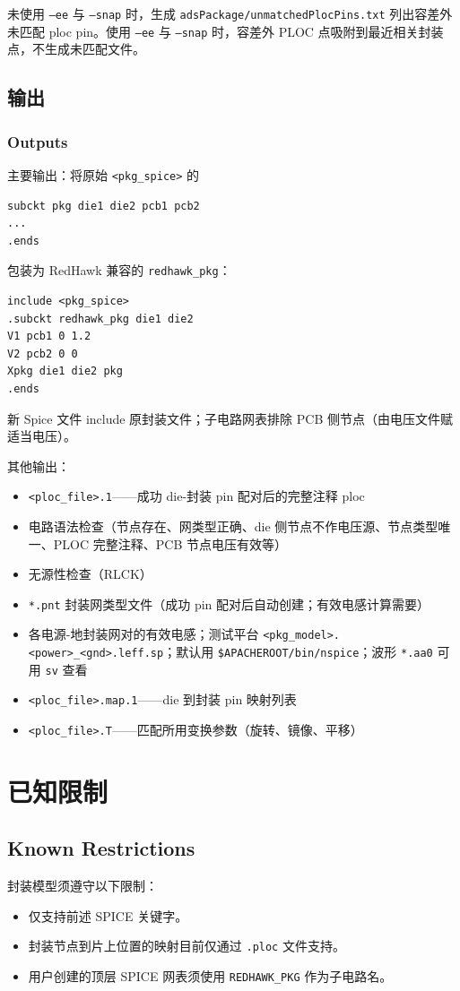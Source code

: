 未使用 \texttt{--ee} 与 \texttt{--snap} 时，生成 \texttt{adsPackage/unmatchedPlocPins.txt} 列出容差外未匹配 ploc pin。使用 \texttt{--ee} 与 \texttt{--snap} 时，容差外 PLOC 点吸附到最近相关封装点，不生成未匹配文件。

\subsection{输出}
\subsubsection*{Outputs}

主要输出：将原始 \texttt{<pkg\_spice>} 的
\begin{lstlisting}
subckt pkg die1 die2 pcb1 pcb2
...
.ends
\end{lstlisting}
包装为 RedHawk 兼容的 \texttt{redhawk\_pkg}：
\begin{lstlisting}
include <pkg_spice>
.subckt redhawk_pkg die1 die2
V1 pcb1 0 1.2
V2 pcb2 0 0
Xpkg die1 die2 pkg
.ends
\end{lstlisting}
新 Spice 文件 include 原封装文件；子电路网表排除 PCB 侧节点（由电压文件赋适当电压）。

其他输出：
\begin{itemize}
  \item \texttt{<ploc\_file>.1}——成功 die-封装 pin 配对后的完整注释 ploc
  \item 电路语法检查（节点存在、网类型正确、die 侧节点不作电压源、节点类型唯一、PLOC 完整注释、PCB 节点电压有效等）
  \item 无源性检查（RLCK）
  \item \texttt{*.pnt} 封装网类型文件（成功 pin 配对后自动创建；有效电感计算需要）
  \item 各电源-地封装网对的有效电感；测试平台 \texttt{<pkg\_model>.<power>\_<gnd>.leff.sp}；默认用 \texttt{\$APACHEROOT/bin/nspice}；波形 \texttt{*.aa0} 可用 \texttt{sv} 查看
  \item \texttt{<ploc\_file>.map.1}——die 到封装 pin 映射列表
  \item \texttt{<ploc\_file>.T}——匹配所用变换参数（旋转、镜像、平移）
\end{itemize}

\section{已知限制}
\subsection*{Known Restrictions}

封装模型须遵守以下限制：
\begin{itemize}
  \item 仅支持前述 SPICE 关键字。
  \item 封装节点到片上位置的映射目前仅通过 \texttt{.ploc} 文件支持。
  \item 用户创建的顶层 SPICE 网表须使用 \texttt{REDHAWK\_PKG} 作为子电路名。
\end{itemize}
